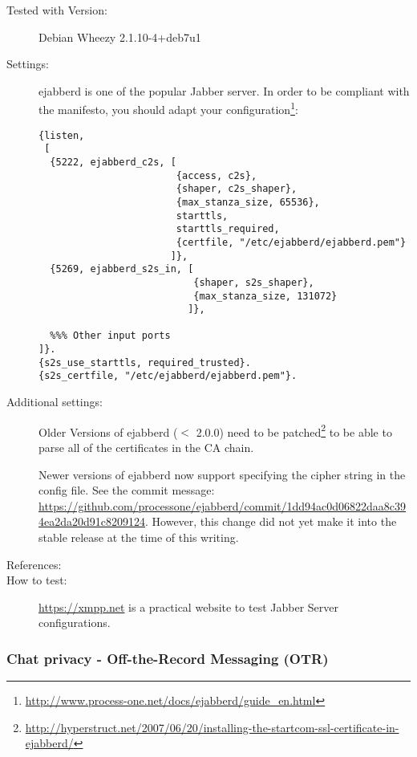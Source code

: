 \begin{description}
\item[Tested with Version:] Debian Wheezy 2.1.10-4+deb7u1

\item[Settings:] \mbox{}


ejabberd is one of the popular Jabber server.  In order to be compliant
with the manifesto, you should adapt your
configuration\footnote{\url{http://www.process-one.net/docs/ejabberd/guide_en.html}}:
\begin{lstlisting}
{listen,
 [
  {5222, ejabberd_c2s, [
                        {access, c2s},
                        {shaper, c2s_shaper},
                        {max_stanza_size, 65536},
                        starttls,
                        starttls_required, 
                        {certfile, "/etc/ejabberd/ejabberd.pem"}
                       ]},
  {5269, ejabberd_s2s_in, [
                           {shaper, s2s_shaper},
                           {max_stanza_size, 131072}
                          ]},

  %%% Other input ports
]}.
{s2s_use_starttls, required_trusted}.
{s2s_certfile, "/etc/ejabberd/ejabberd.pem"}.
\end{lstlisting}

\item[Additional settings:]

Older Versions of ejabberd ($ < $ 2.0.0) need to be patched\footnote{\url{http://hyperstruct.net/2007/06/20/installing-the-startcom-ssl-certificate-in-ejabberd/}} to be able to parse all of the certificates in the CA chain.

Newer versions of ejabberd now support specifying the cipher string in the config file. See the commit message: \url{https://github.com/processone/ejabberd/commit/1dd94ac0d06822daa8c394ea2da20d91c8209124}. However, this change did not yet make it into the stable release at the time of this writing. 


\item[References:] 

\item[How to test:] \url{https://xmpp.net} is a practical website to test Jabber Server configurations.

\end{description}


\subsubsection{Chat privacy - Off-the-Record Messaging (OTR)}

